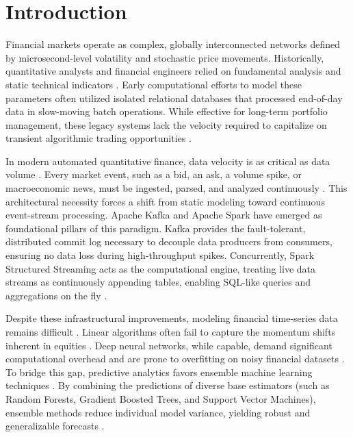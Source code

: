 \documentclass[conference]{IEEEtran}
\begin{document}
\section{Introduction}
Financial markets operate as complex, globally interconnected networks defined by microsecond-level volatility and stochastic price movements. Historically, quantitative analysts and financial engineers relied on fundamental analysis and static technical indicators \cite{ref1, ref2}. Early computational efforts to model these parameters often utilized isolated relational databases that processed end-of-day data in slow-moving batch operations. While effective for long-term portfolio management, these legacy systems lack the velocity required to capitalize on transient algorithmic trading opportunities \cite{ref3}.

In modern automated quantitative finance, data velocity is as critical as data volume \cite{ref4}. Every market event, such as a bid, an ask, a volume spike, or macroeconomic news, must be ingested, parsed, and analyzed continuously \cite{ref5}. This architectural necessity forces a shift from static modeling toward continuous event-stream processing. Apache Kafka \cite{ref6} and Apache Spark \cite{ref7} have emerged as foundational pillars of this paradigm. Kafka provides the fault-tolerant, distributed commit log necessary to decouple data producers from consumers, ensuring no data loss during high-throughput spikes. Concurrently, Spark Structured Streaming acts as the computational engine, treating live data streams as continuously appending tables, enabling SQL-like queries and aggregations on the fly \cite{ref8}.

Despite these infrastructural improvements, modeling financial time-series data remains difficult \cite{ref9}. Linear algorithms often fail to capture the momentum shifts inherent in equities \cite{ref10}. Deep neural networks, while capable, demand significant computational overhead and are prone to overfitting on noisy financial datasets \cite{ref11}. To bridge this gap, predictive analytics favors ensemble machine learning techniques \cite{ref12}. By combining the predictions of diverse base estimators (such as Random Forests, Gradient Boosted Trees, and Support Vector Machines), ensemble methods reduce individual model variance, yielding robust and generalizable forecasts \cite{ref13}.
\end{document}
